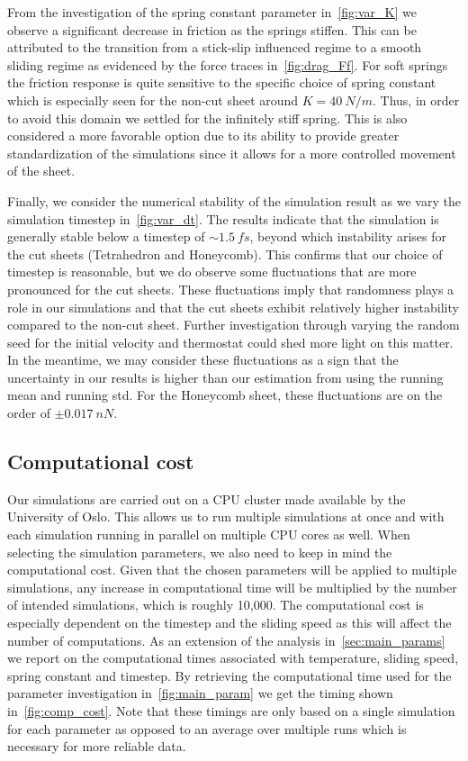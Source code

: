 From the investigation of the spring constant parameter in~\cref{fig:var_K} we observe a significant decrease in friction as the springs stiffen. This can be attributed to the transition from a stick-slip influenced regime to a smooth sliding regime as evidenced by the force traces in~\cref{fig:drag_Ff}. For soft springs the friction response is quite sensitive to the specific choice of spring constant which is especially seen for the non-cut sheet around $K = \SI{40}{N/m}$. Thus, in order to avoid this domain we settled for the infinitely stiff spring. This is also considered a more favorable option due to its ability to provide greater standardization of the simulations since it allows for a more controlled movement of the sheet.

Finally, we consider the numerical stability of the simulation result as we vary
the simulation timestep in~\cref{fig:var_dt}. The results indicate that the simulation is generally stable below a timestep of $\sim \SI{1.5}{fs}$, beyond which instability arises for the cut sheets (Tetrahedron and Honeycomb). This confirms that our choice of timestep is reasonable, but we do observe some fluctuations that are more pronounced for the cut sheets. These fluctuations imply that randomness plays a role in our simulations and that the cut sheets exhibit relatively higher instability compared to the non-cut sheet. Further investigation through varying the random seed for the initial velocity and thermostat could shed more light on this matter. In the meantime, we may consider these fluctuations as a sign that the uncertainty in our results is higher than our estimation from using the running mean and running \acrshort{std}. For the Honeycomb sheet, these fluctuations are on the order of $\pm \SI{0.017}{nN}$.



\subsection{Computational cost}
Our simulations are carried out on a CPU cluster made available by the University of Oslo. This allows us to run multiple simulations at once and with each simulation running in parallel on multiple CPU cores as well. When selecting the simulation parameters, we also need to keep in mind the computational cost. Given that the chosen parameters will be applied to multiple simulations, any increase in computational time will be multiplied by the number of intended simulations, which is roughly 10,000. The computational cost is especially dependent on the timestep and the sliding speed as this will affect the number of computations. As an extension of the analysis in~\cref{sec:main_params} we
report on the computational times associated with temperature, sliding speed,
spring constant and timestep. By retrieving the computational time used for the
parameter investigation in~\cref{fig:main_param} we get the timing shown in~\cref{fig:comp_cost}. Note that these timings are only based on a single simulation for each parameter as opposed to an average over multiple runs which is
necessary for more reliable data. 


